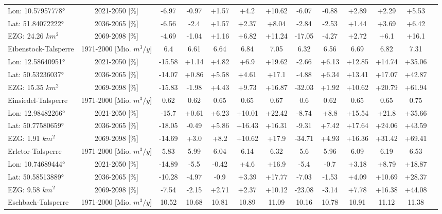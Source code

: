 \begin{longtable}{@{\extracolsep{\fill}}lc|ccccc||cccccc}
Lon: 10.57957778° & 2021-2050 [\%]  & -6.97 & -0.97 & +1.57 & +4.2 & +10.62 & -6.07 & -0.88 & +2.89 & +2.29 & +5.53 & \\ 
Lat: 51.84072222° & 2036-2065 [\%]  & -6.56 & -2.4 & +1.57 & +2.37 & +8.04 & -2.84 & -2.53 & +1.44 & +3.69 & +6.42 & \\ 
EZG: 24.26 $km^2$ & 2069-2098 [\%]  & -4.69 & -1.04 & +1.16 & +6.82 & +11.24 & -17.05 & -4.27 & +2.72 & +6.1 & +16.1 & \\ 
\hline 
Eibenstock-Talsperre & 1971-2000 [Mio. $m^3/y$]  & 6.4 & 6.61 & 6.64 & 6.84 & 7.05 & 6.32 & 6.56 & 6.69 & 6.82 & 7.31 & \\ 
\cline{2-13} 
Lon: 12.58640951° & 2021-2050 [\%]  & -15.58 & +1.14 & +4.82 & +6.9 & +19.62 & -2.66 & +6.13 & +12.85 & +14.74 & +35.06 & \\ 
Lat: 50.53236037° & 2036-2065 [\%]  & -14.07 & +0.86 & +5.58 & +4.61 & +17.1 & -4.88 & +6.34 & +13.41 & +17.07 & +42.87 & \\ 
EZG: 15.35 $km^2$ & 2069-2098 [\%]  & -15.83 & -1.98 & +4.43 & +9.73 & +16.87 & -32.03 & +1.92 & +10.62 & +20.79 & +61.94 & \\ 
\hline 
Einsiedel-Talsperre & 1971-2000 [Mio. $m^3/y$]  & 0.62 & 0.62 & 0.65 & 0.65 & 0.67 & 0.6 & 0.62 & 0.65 & 0.65 & 0.75 & \\ 
\cline{2-13} 
Lon: 12.98482266° & 2021-2050 [\%]  & -15.7 & +0.61 & +6.23 & +10.01 & +22.42 & -8.74 & +8.8 & +15.54 & +21.8 & +35.66 & \\ 
Lat: 50.77580659° & 2036-2065 [\%]  & -18.05 & -0.49 & +5.86 & +16.43 & +16.31 & -9.31 & +7.42 & +17.64 & +24.06 & +43.59 & \\ 
EZG: 1.91 $km^2$ & 2069-2098 [\%]  & -14.69 & +3.0 & +8.2 & +10.62 & +17.9 & -34.71 & +4.93 & +16.36 & +31.42 & +69.41 & \\ 
\hline 
Erletor-Talsperre & 1971-2000 [Mio. $m^3/y$]  & 5.83 & 5.99 & 6.04 & 6.14 & 6.32 & 5.6 & 5.96 & 6.09 & 6.19 & 6.53 & \\ 
\cline{2-13} 
Lon: 10.74689444° & 2021-2050 [\%]  & -14.89 & -5.5 & -0.42 & +4.6 & +16.9 & -5.4 & -0.7 & +3.18 & +8.79 & +18.87 & \\ 
Lat: 50.58513889° & 2036-2065 [\%]  & -10.28 & -4.97 & -0.9 & +3.39 & +17.77 & -7.03 & -1.53 & +4.09 & +10.69 & +28.37 & \\ 
EZG: 9.58 $km^2$ & 2069-2098 [\%]  & -7.54 & -2.15 & +2.71 & +2.37 & +10.12 & -23.08 & -3.14 & +7.78 & +16.38 & +44.08 & \\ 
\hline 
Eschbach-Talsperre & 1971-2000 [Mio. $m^3/y$]  & 10.52 & 10.68 & 10.81 & 10.89 & 11.09 & 10.16 & 10.78 & 10.91 & 11.12 & 11.38 & \\ 

\end{longtable}
